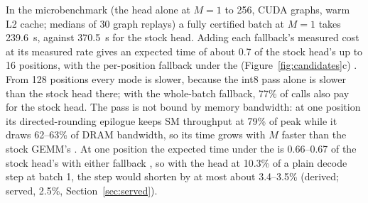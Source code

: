 In the microbenchmark (the head alone at $M=1$ to 256, CUDA graphs, warm L2 cache; medians of 30 graph replays) a fully certified batch at $M=1$ takes 239.6~\textmu s, against 370.5~\textmu s for the stock head. Adding each fallback's measured cost at its measured rate gives an expected time of about 0.7 of the stock head's up to 16 positions, with the per-position fallback under the \modelcons{} (Figure~\ref{fig:candidates}c) . From 128 positions every mode is slower, because the int8 pass alone is slower than the stock head there; with the whole-batch fallback, 77\% of calls also pay for the stock head. The pass is not bound by memory bandwidth: at one position its directed-rounding epilogue keeps SM throughput at 79\% of peak while it draws 62--63\% of DRAM bandwidth, so its time grows with $M$ faster than the stock GEMM's . At one position the expected time under the \modelcons{} is 0.66--0.67 of the stock head's with either fallback , so with the head at 10.3\% of a plain decode step at batch 1, the step would shorten by at most about 3.4--3.5\% (derived; served, 2.5\%, Section~\ref{sec:served}).

